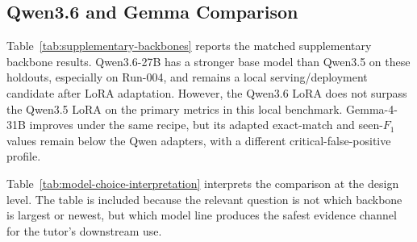 \subsection{Qwen3.6 and Gemma Comparison}

Table~\ref{tab:supplementary-backbones} reports the matched supplementary
backbone results. Qwen3.6-27B has a stronger base model than Qwen3.5 on these
holdouts, especially on Run-004, and remains a local serving/deployment
candidate after LoRA adaptation. However, the Qwen3.6 LoRA does not surpass the
Qwen3.5 LoRA on the primary metrics in this local benchmark. Gemma-4-31B
improves under the same recipe, but its adapted exact-match and seen-$F_1$
values remain below the Qwen adapters, with a different
critical-false-positive profile.

\begin{table}[htbp]
\centering
\caption{Supplementary backbone comparison under the matched Run-003 + Run-005$\times$2 recipe.}
\label{tab:supplementary-backbones}
\end{table}

Table~\ref{tab:model-choice-interpretation} interprets the comparison at the
design level. The table is included because the relevant question is not which
backbone is largest or newest, but which model line produces the safest
evidence channel for the tutor's downstream use.

